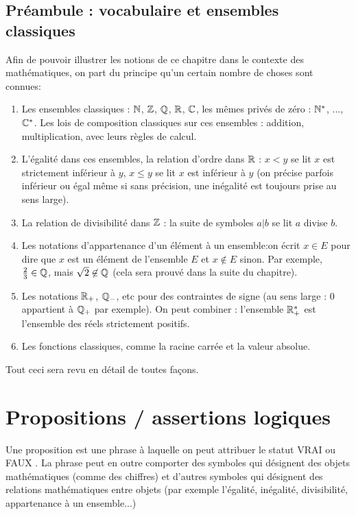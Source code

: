 
\subsection{Préambule : vocabulaire et ensembles classiques}
Afin de pouvoir illustrer les notions de ce chapitre dans le contexte des mathématiques, on part du principe qu'un certain nombre de choses sont connues:

\begin{enumerate}
\item Les ensembles classiques :  $\mathbb{N}$, $\mathbb{Z}$, $\mathbb{Q}$, $\mathbb{R}$, $\mathbb{C}$, les mêmes privés de zéro : $\mathbb{N}^*$, ..., $\mathbb{C}^*$. Les lois de composition classiques sur ces ensembles : addition, multiplication, avec leurs règles de calcul.
\item L'égalité dans ces ensembles, la relation d'ordre dans $\mathbb{R}$ : $x< y$ se lit \og$x$ est strictement inférieur à $y$\fg, $x\leq y$ se lit \og $x$ est inférieur à $y$\fg{} (on précise parfois \og inférieur ou égal\fg{} même si sans précision, une inégalité est toujours prise au sens large).
\item La relation de divisibilité dans $\mathbb{Z}$ : la suite de symboles $a|b$ se lit \og $a$ divise $b$\fg.
\item Les notations d'appartenance d'un élément à un ensemble:on écrit $x \in E$ pour dire que $x$ est un élément de l'ensemble $E$ et $x\not\in E$ sinon. Par exemple, $\frac23 \in \mathbb{Q}$, mais $\sqrt{2} \not\in\mathbb{Q}$ (cela sera prouvé dans la suite du chapitre). 
\item Les notations $\mathbb{R}_+$, $\mathbb{Q}_-$, etc pour des contraintes de signe (au sens large : $0$ appartient à $\mathbb{Q}_+$ par exemple). On peut combiner : l'ensemble $\mathbb{R}_+^*$ est l'ensemble des réels strictement positifs. 
\item Les fonctions classiques, comme la racine carrée et la valeur absolue.
\end{enumerate}

Tout ceci sera revu en détail de toutes façons.


\section{Propositions / assertions logiques}

\begin{definition}
Une proposition est une phrase à laquelle on peut attribuer le statut \og VRAI\fg{} ou \og FAUX \fg{}. La phrase peut en outre comporter des symboles qui désignent des objets mathématiques (comme des chiffres) et d'autres symboles qui désignent des relations mathématiques entre objets (par exemple l'égalité, inégalité, divisibilité, appartenance à un ensemble...)
\end{definition}

